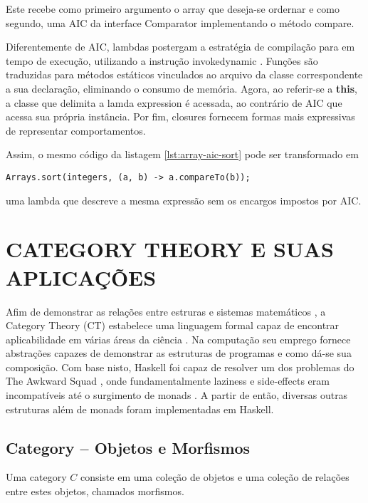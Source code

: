 \documentclass[10pt, conference]{IEEEtran}
\begin{document}
Este recebe como primeiro argumento o array que deseja-se ordernar e como segundo, uma AIC da interface Comparator implementando o método compare.

Diferentemente de AIC, lambdas postergam a estratégia de compilação para em tempo de execução, utilizando a instrução invokedynamic \cite{goetz2012translation}. Funções são traduzidas para métodos estáticos vinculados ao arquivo da classe correspondente a sua declaração, eliminando o consumo de memória. Agora, ao referir-se a \textbf{this}, a classe que delimita a lamda expression é acessada, ao contrário de AIC que acessa sua própria instância. Por fim, closures fornecem formas mais expressivas de representar comportamentos.

Assim, o mesmo código da listagem \ref{lst:array-aic-sort} pode ser transformado em

\begin{lstlisting}[caption={Lambda Expressions}]
Arrays.sort(integers, (a, b) -> a.compareTo(b));
\end{lstlisting}

uma lambda que descreve a mesma expressão sem os encargos impostos por AIC.

\section{CATEGORY THEORY E SUAS APLICAÇÕES}

Afim de demonstrar as relações entre estruras e sistemas matemáticos \cite{maclane1971mat}, a Category Theory (CT) estabelece uma linguagem formal capaz de encontrar aplicabilidade em várias áreas da ciência \cite{spivak2014cts}. Na computação seu emprego fornece abstrações capazes de demonstrar as estruturas de programas e como dá-se sua composição. Com base nisto, Haskell foi capaz de resolver um dos problemas do The Awkward Squad \cite{jones2001tacklingthe}, onde fundamentalmente laziness e side-effects eram incompatíveis até o surgimento de monads \cite{mogi1991monad}. A partir de então, diversas outras estruturas além de monads foram implementadas em Haskell.

\subsection{Category -- Objetos e Morfismos}

Uma category $C$ consiste em uma coleção de objetos e uma coleção de relações entre estes objetos, chamados morfismos.\\
\end{document}
